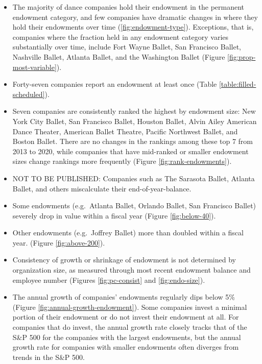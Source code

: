 \documentclass[Dance Data
Project,article,submit,moreauthors,pdftex]{mdpi}
\providecommand{\tightlist}{%
  \setlength{\itemsep}{0pt}\setlength{\parskip}{0pt}}
\begin{document}
\begin{itemize}
\tightlist
\item
  The majority of dance companies hold their endowment in the permanent
  endowment category, and few companies have dramatic changes in where
  they hold their endowments over time (\ref{fig:endowment-type}).
  Exceptions, that is, companies where the fraction held in any
  endowment category varies substantially over time, include Fort Wayne
  Ballet, San Francisco Ballet, Nashville Ballet, Atlanta Ballet, and
  the Washington Ballet (Figure \ref{fig:prop-most-variable}).\\
\item
  Forty-seven companies report an endowment at least once (Table
  \ref{table:filled-scheduled}).\\
\item
  Seven companies are consistently ranked the highest by endowment size:
  New York City Ballet, San Francisco Ballet, Houston Ballet, Alvin
  Ailey American Dance Theater, American Ballet Theatre, Pacific
  Northwest Ballet, and Boston Ballet. There are no changes in the
  rankings among these top 7 from 2013 to 2020, while companies that
  have mid-ranked or smaller endowment sizes change rankings more
  frequently (Figure \ref{fig:rank-endowments}).
\item
  NOT TO BE PUBLISHED: Companies such as The Sarasota Ballet, Atlanta
  Ballet, and others miscalculate their end-of-year-balance.\\
\item
  Some endowments (e.g.~Atlanta Ballet, Orlando Ballet, San Francisco
  Ballet) severely drop in value within a fiscal year (Figure
  \ref{fig:below-40}).\\
\item
  Other endowments (e.g.~Joffrey Ballet) more than doubled within a
  fiscal year. (Figure \ref{fig:above-200}).\\
\item
  Consistency of growth or shrinkage of endowment is not determined by
  organization size, as measured through most recent endowment balance
  and employee number (Figures \ref{fig:pc-consist} and
  \ref{fig:endo-size}).\\
\item
  The annual growth of companies' endowments regularly dips below 5\%
  (Figure \ref{fig:annual-growth-endowment}). Some companies invest a
  minimal portion of their endowment or do not invest their endowment at
  all. For companies that do invest, the annual growth rate closely
  tracks that of the S\&P 500 for the companies with the largest
  endowments, but the annual growth rate for companies with smaller
  endowments often diverges from trends in the S\&P 500.
\end{itemize}
\end{document}
